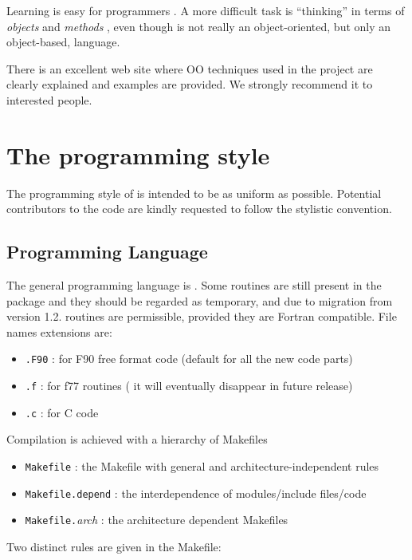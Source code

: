 Learning \fort is easy for \oldfort  programmers
\cite{Brainerd,Metcalf,Kerrigan}. A more difficult task is ``thinking'' in
terms of {\em objects} and {\em methods} \cite{Stroustrup}, even though
\fort is not really an object-oriented, but only an object-based, language.\par
There is an excellent web site \cite{oof90_web} where OO techniques used in the \PR project are
clearly explained and examples are provided. We strongly recommend it to
interested  people.


\chapter{The \PR programming style}

The programming style of \PR is intended to be as uniform as possible.
Potential contributors to the code are kindly requested to follow the stylistic convention.

\section{Programming Language}

The general programming language is \fort. 
Some \oldfort routines are still present in the
package and they should be regarded as temporary, and due to migration
from version 1.2.
\C routines are permissible, provided they
are Fortran compatible.
File names extensions are:

 \begin{itemize}
 \item 
 \verb=.F90= : for F90 free format code (default for all the new code parts)
 \item
 \verb=.f= : for f77 routines ( it will eventually disappear in future release)
 \item
 \verb=.c= : for C code 
 \end{itemize}

Compilation is achieved with a hierarchy of Makefiles
 \begin{itemize}
  \item
    \verb=Makefile= : the Makefile with general and architecture-independent 
                      rules
  \item
    \verb=Makefile.depend= : the interdependence of modules/include files/code
  \item
    \verb=Makefile.={\it arch} : the architecture dependent Makefiles
  \end{itemize}
Two distinct rules are given in the Makefile:

